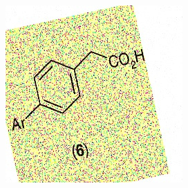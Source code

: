 \begin{figure}[H]
\begin{subfigure}{.23\textwidth}
        \includegraphics[width=1\linewidth]{imagenes/aug3/183.jpg}
    \end{subfigure}%

    \bigskip


\end{figure}
